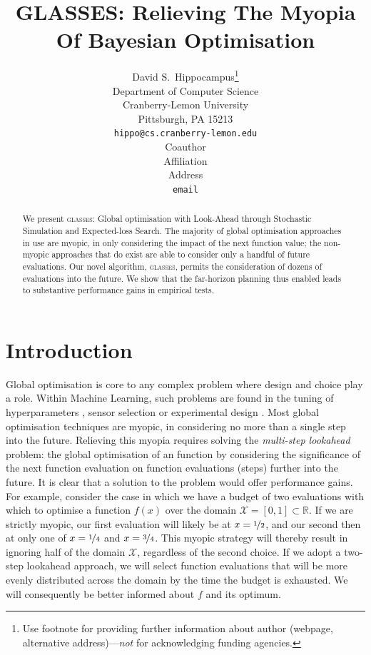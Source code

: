 \documentclass{article} %
\title{
    GLASSES: Relieving The Myopia Of Bayesian Optimisation
}
\author{
David S.~Hippocampus\thanks{ Use footnote for providing further information about author (webpage, alternative address)---\emph{not} for acknowledging funding agencies.} \\
Department of Computer Science\\
Cranberry-Lemon University\\
Pittsburgh, PA 15213 \\
\texttt{hippo@cs.cranberry-lemon.edu} \\
\And
Coauthor \\
Affiliation \\
Address \\
\texttt{email} \\
}
\newcommand{\reals}{\mathbb{R}}
\newcommand{\sX}{\mathcal{X}}
\newcommand{\acr}[1]{\textsc{#1}\xspace}
\newcommand{\us}{\acr{glasses}}
\begin{document}
\maketitle

\begin{abstract}
    We present \us: Global optimisation with Look-Ahead through Stochastic Simulation and Expected-loss Search. 
    The majority of global optimisation approaches in use are myopic, in only considering the impact of the next function value; the non-myopic approaches that do exist are able to consider only a handful of future evaluations. 
    Our novel algorithm, \us, permits the consideration of dozens of evaluations into the future. 
    We show that the far-horizon planning thus enabled leads to substantive performance gains in empirical tests. 
\end{abstract}

\section{Introduction} %
\label{sec:introduction}

Global optimisation is core to any complex problem where design and choice play a role. 
Within Machine Learning, such problems are found in the tuning of hyperparameters \cite{Snoek*Larochelle*Adams_2012}, sensor selection \cite{Garnett*Osborne*Roberts_2010} or experimental design \cite{martinez-cantin_bayesian_2009}. 
Most global optimisation techniques are myopic, in considering no more than a single step into the future. 
Relieving this myopia requires solving the \emph{multi-step lookahead} problem: the global optimisation of an function by considering the significance of the next function evaluation on function evaluations (steps) further into the future. 
It is clear that a solution to the problem would offer performance gains.
For example, consider the case in which we have a budget of two evaluations with which to optimise a function $f(x)$ over the domain $\sX = [0, 1] \subset \reals$. 
If we are strictly myopic, our first evaluation will likely be at 
$x=\nicefrac{1}{2}$, and our second then at only one of $x=\nicefrac{1}{4}$ and $x=\nicefrac{3}{4}$. 
This myopic strategy will thereby result in ignoring half of the domain $\sX$, regardless of the second choice. 
If we adopt a two-step lookahead approach, we will select function evaluations that will be more evenly distributed across the domain by the time the budget is exhausted. 
We will consequently be better informed about $f$ and its optimum.
\end{document}
